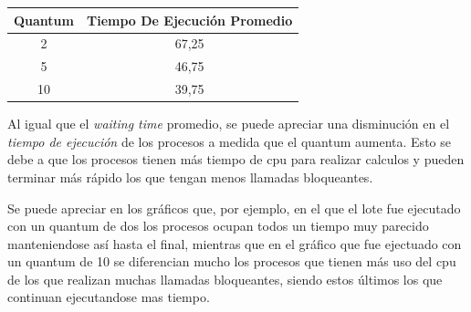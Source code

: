 \begin{center}
	\begin{tabular}{|c|c|}
		\hline
		\textbf{Quantum} & \textbf{Tiempo De Ejecución Promedio} \\
		\hline
		2 & 67,25 \\
		\hline
		5 & 46,75 \\
		\hline
		10 & 39,75 \\
		\hline
	\end{tabular}
\end{center}

Al igual que el \emph{waiting time} promedio, se puede apreciar una disminución en el \emph{tiempo de ejecución} de los procesos a medida que el quantum aumenta. Esto se debe a que los procesos tienen más tiempo de cpu para realizar calculos y pueden terminar más rápido los que tengan menos llamadas bloqueantes.

Se puede apreciar en los gráficos que, por ejemplo, en el que el lote fue ejecutado con un quantum de dos los procesos ocupan todos un tiempo muy parecido manteniendose así hasta el final, mientras que en el gráfico que fue ejectuado con un quantum de 10 se diferencian mucho los procesos que tienen más uso del cpu de los que realizan muchas llamadas bloqueantes, siendo estos últimos los que continuan ejecutandose mas tiempo.